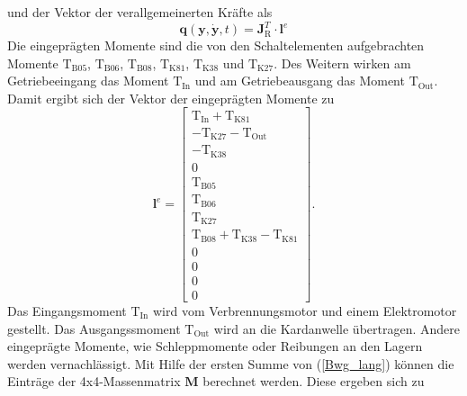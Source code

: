 und der Vektor der verallgemeinerten Kräfte als
  \begin{equation}
\pmb{q}(\pmb{y},\dot{\pmb{y}},t) = \pmb{J}_\mathrm{R}^T\cdot\mathrm{\pmb{l}}^e 
\end{equation}
Die eingeprägten Momente sind die von den Schaltelementen aufgebrachten Momente $\mathrm{T}_{\mathrm{B05}}$, $\mathrm{T}_{\mathrm{B06}}$, $\mathrm{T}_{\mathrm{B08}}$, $\mathrm{T}_{\mathrm{K81}}$, $\mathrm{T}_{\mathrm{K38}}$ und $\mathrm{T}_{\mathrm{K27}}$. Des Weitern wirken am Getriebeeingang das Moment $\mathrm{T}_{\mathrm{In}}$ und am Getriebeausgang das Moment $\mathrm{T}_{\mathrm{Out}}$. Damit ergibt sich der Vektor der eingeprägten Momente zu
\begin{equation}\label{eq:le}
\mathrm{\pmb{l}}^e = \begin{bmatrix} \mathrm{T}_{\mathrm{In}}+\mathrm{T}_{\mathrm{K81}} \\ -\mathrm{T}_{\mathrm{K27}}-\mathrm{T}_{\mathrm{Out}} \\ -\mathrm{T}_{\mathrm{K38}} \\ 0 \\ \mathrm{T}_{\mathrm{B05}} \\ \mathrm{T}_{\mathrm{B06}} \\ \mathrm{T}_{\mathrm{K27}} \\ \mathrm{T}_{\mathrm{B08}}+\mathrm{T}_{\mathrm{K38}}-\mathrm{T}_{\mathrm{K81}} \\ 0 \\ 0 \\ 0 \\ 0 \end{bmatrix}.
\end{equation}
Das Eingangsmoment $\mathrm{T}_{\mathrm{In}}$ wird vom Verbrennungsmotor und einem Elektromotor gestellt. Das Ausgangssmoment $\mathrm{T}_{\mathrm{Out}}$ wird an die Kardanwelle übertragen. Andere eingeprägte Momente, wie Schleppmomente oder Reibungen an den Lagern werden vernachlässigt. Mit Hilfe der ersten Summe von (\ref{Bwg_lang}) können die Einträge der 4x4-Massenmatrix $\pmb{M}$ berechnet werden. Diese ergeben sich zu
